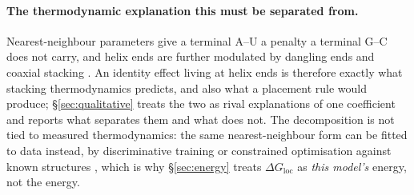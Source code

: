 \documentclass[11pt]{article}
\begin{document}
\paragraph{The thermodynamic explanation this must be separated from.} Nearest-neighbour parameters
\citep{freier1986improved,xia1998thermodynamic,mathews1999expanded,turner2010nndb} give a terminal
A--U a penalty a terminal G--C does not carry, and helix ends are further modulated by dangling ends
and coaxial stacking \citep{serra1995predicting,walter1994coaxial}. An identity effect living at helix ends is therefore exactly what stacking thermodynamics predicts,
and also what a placement rule would produce; \S\ref{sec:qualitative} treats the two as rival
explanations of one coefficient and reports what separates them and what does not. The decomposition is not tied to measured thermodynamics: the same nearest-neighbour form can be
fitted to data instead, by discriminative training \citep{do2006contrafold} or constrained
optimisation against known structures \citep{andronescu2007efficient}, which is why
\S\ref{sec:energy} treats $\Delta G_{\mathrm{loc}}$ as \emph{this model's} energy, not the energy.
\end{document}
